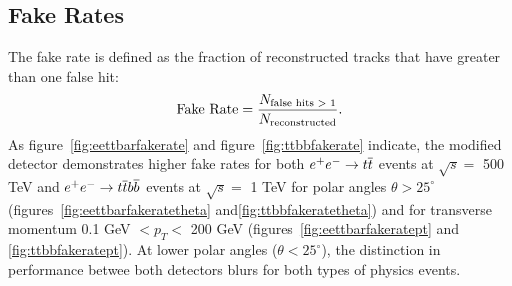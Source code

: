 \subsection{Fake Rates}
The fake rate is defined as the fraction of reconstructed tracks that have greater than one false hit:
\begin{equation}
\mbox{Fake Rate}=\frac{N_{\mbox{\scriptsize{false hits $>$ 1}}}}{N_{\mbox{\scriptsize{reconstructed}}}}.
\label{eq:fakerate}
\end{equation}
As figure~\ref{fig:eettbarfakerate} and figure~\ref{fig:ttbbfakerate} indicate, the modified detector
demonstrates higher fake rates for both  $\ee \rightarrow \ttbar$ events at $ \sqrt{s} = $ 500 TeV
and  $\ee \rightarrow \ttbar \bbbar$ events at $ \sqrt{s} = $ 1 TeV
 for polar angles $\theta > 25^{\circ}$ (figures~\ref{fig:eettbarfakeratetheta} and\ref{fig:ttbbfakeratetheta})
and for transverse momentum 0.1 GeV $< p_{T} < $ 200 GeV (figures~\ref{fig:eettbarfakeratept} and \ref{fig:ttbbfakeratept}).
At lower polar angles ($\theta < 25^{\circ}$), the distinction in performance betwee both detectors blurs 
for both types of physics events.
